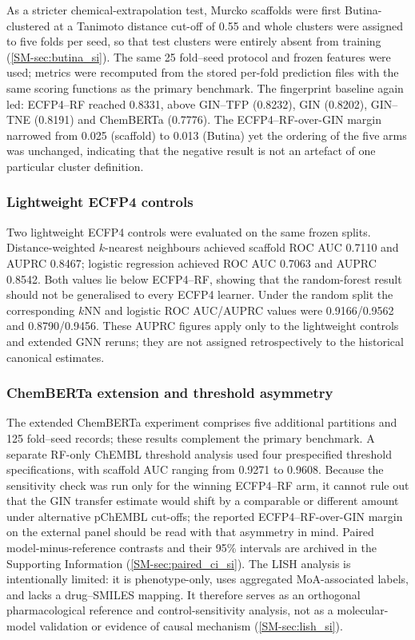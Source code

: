 \documentclass[11pt,a4paper]{article}
\begin{document}
As a stricter chemical-extrapolation test, Murcko scaffolds were first Butina-clustered at a Tanimoto distance cut-off of \num{0.55} and whole clusters were assigned to five folds per seed, so that test clusters were entirely absent from training (\cref{SM-sec:butina_si}). The same \num{25} fold--seed protocol and frozen features were used; metrics were recomputed from the stored per-fold prediction files with the same scoring functions as the primary benchmark. The fingerprint baseline again led: ECFP4--RF reached \num{0.8331}, above GIN--TFP (\num{0.8232}), GIN (\num{0.8202}), GIN--TNE (\num{0.8191}) and ChemBERTa (\num{0.7776}). The ECFP4--RF-over-GIN margin narrowed from \num{0.025} (scaffold) to \num{0.013} (Butina) yet the ordering of the five arms was unchanged, indicating that the negative result is not an artefact of one particular cluster definition.

\subsubsection{Lightweight ECFP4 controls}

Two lightweight ECFP4 controls were evaluated on the same frozen splits. Distance-weighted $k$-nearest neighbours achieved scaffold ROC AUC \num{0.7110} and AUPRC \num{0.8467}; logistic regression achieved ROC AUC \num{0.7063} and AUPRC \num{0.8542}. Both values lie below ECFP4--RF, showing that the random-forest result should not be generalised to every ECFP4 learner. Under the random split the corresponding $k$NN and logistic ROC AUC/AUPRC values were \num{0.9166}/\num{0.9562} and \num{0.8790}/\num{0.9456}. These AUPRC figures apply only to the lightweight controls and extended GNN reruns; they are not assigned retrospectively to the historical canonical estimates.

\subsubsection{ChemBERTa extension and threshold asymmetry}

The extended ChemBERTa experiment comprises five additional partitions and \num{125} fold--seed records; these results complement the primary benchmark. A separate RF-only ChEMBL threshold analysis used four prespecified threshold specifications, with scaffold AUC ranging from \num{0.9271} to \num{0.9608}. Because the sensitivity check was run only for the winning ECFP4--RF arm, it cannot rule out that the GIN transfer estimate would shift by a comparable or different amount under alternative pChEMBL cut-offs; the reported ECFP4--RF-over-GIN margin on the external panel should be read with that asymmetry in mind. Paired model-minus-reference contrasts and their 95\% intervals are archived in the Supporting Information (\cref{SM-sec:paired_ci_si}). The LISH analysis is intentionally limited: it is phenotype-only, uses aggregated MoA-associated labels, and lacks a drug--SMILES mapping. It therefore serves as an orthogonal pharmacological reference and control-sensitivity analysis, not as a molecular-model validation or evidence of causal mechanism (\cref{SM-sec:lish_si}).
\end{document}
